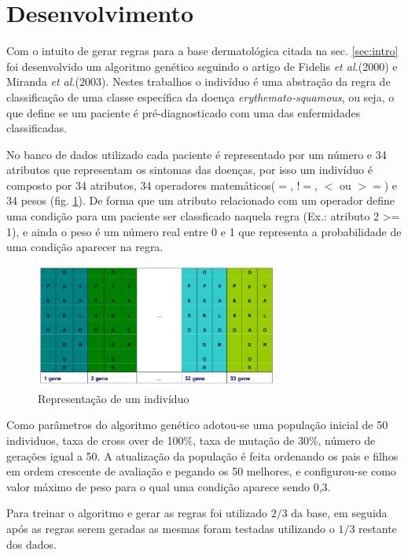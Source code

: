 \documentclass[11pt]{article}
\begin{document}
\section{Desenvolvimento}
\label{sec:desen}

Com o intuito de gerar regras para a base dermatológica citada na sec.
\ref{sec:intro} foi desenvolvido um algoritmo genético seguindo o artigo de
Fidelis \textit{et al.}(2000) e Miranda \textit{et al.}(2003). Nestes trabalhos o indivíduo é uma
abstração da regra de classificação de uma classe específica da doença
\textit{erythemato-squamous}, ou seja, o que define se um paciente é
pré-diagnosticado com uma das enfermidades classificadas.

No banco de dados utilizado cada paciente é representado por um número e 34
atributos que representam os sintomas das doenças, por isso um indivíduo é
composto por 34 atributos, 34 operadores matemáticos($=$, $!=$, $<$ ou $>=$) e
34 pesos (fig. \ref{fig:individuo}). De forma que um atributo relacionado com um
operador define uma condição para um paciente ser classficado naquela regra
(Ex.: atributo 2 >= 1), e ainda o peso é um número real entre 0 e 1 que
representa a probabilidade de uma condição aparecer na regra.

\begin{figure}
  \centering
  \includegraphics[width=8cm]{individuo.png}
  \caption{Representação de um indivíduo}
  \label{fig:individuo}
\end{figure}

Como parâmetros do algoritmo genético adotou-se uma população inicial de
50 individuos, taxa de cross over de 100\%, taxa de mutação de 30\%, número de
gerações igual a 50. A atualização da população é feita ordenando os pais e
filhos em ordem crescente de avaliação e pegando os 50 melhores, e configurou-se
como valor máximo de peso para o qual uma condição aparece sendo 0,3.

Para treinar o algoritmo e gerar as regras foi utilizado $2/3$ da base, em seguida
após as regras serem geradas as mesmas foram testadas utilizando o $1/3$ restante
dos dados.
\end{document}
